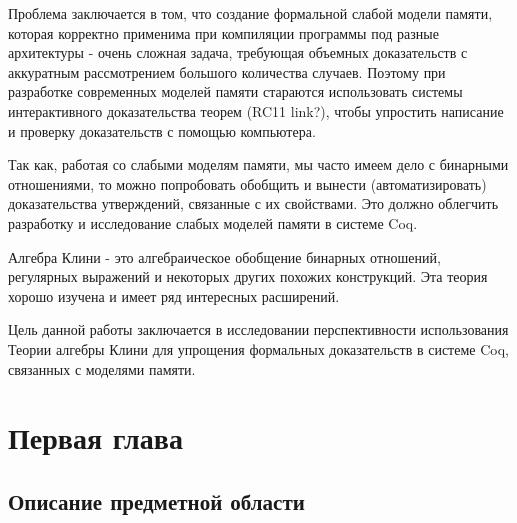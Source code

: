 \documentclass[times
              ]{itmo-student-thesis}
\begin{document}
Проблема заключается в том, что создание формальной слабой модели памяти, которая корректно применима при компиляции программы под разные архитектуры - очень сложная задача, требующая объемных доказательств с аккуратным рассмотрением большого количества случаев.
Поэтому при разработке современных моделей памяти стараются использовать системы интерактивного доказательства теорем (RC11 link?), чтобы упростить написание и проверку доказательств с помощью компьютера.

Так как, работая со слабыми моделям памяти, мы часто имеем дело с бинарными отношениями, то можно попробовать обобщить и вынести (автоматизировать) доказательства утверждений, связанные с их свойствами.
Это должно облегчить разработку и исследование слабых моделей памяти в системе Coq.

Алгебра Клини - это алгебраическое обобщение бинарных отношений, регулярных выражений и некоторых других похожих конструкций.
Эта теория хорошо изучена и имеет ряд интересных расширений.

Цель данной работы заключается в исследовании перспективности использования Теории алгебры Клини для упрощения формальных доказательств в системе Coq, связанных с моделями памяти.


\chapter{Первая глава}
  \section{Описание предметной области}

\end{document}
